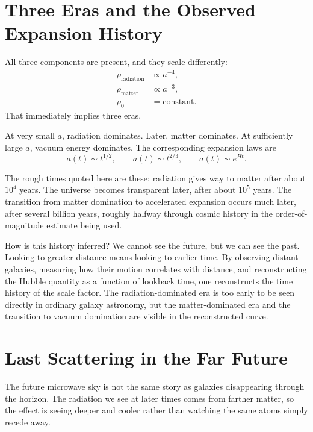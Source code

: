 \section{Three Eras and the Observed Expansion History}

All three components are present, and they scale differently:
\begin{equation}
\begin{aligned}
\rho_{\text{radiation}}&\propto a^{-4},\\
\rho_{\text{matter}}&\propto a^{-3},\\
\rho_0&=\text{constant}.
\end{aligned}
\end{equation}
That immediately implies three eras.

At very small \(a\), radiation dominates. Later, matter dominates. At sufficiently large \(a\), vacuum energy dominates. The corresponding expansion laws are
\begin{equation}
a(t)\sim t^{1/2},
\qquad
a(t)\sim t^{2/3},
\qquad
a(t)\sim e^{Ht}.
\end{equation}

The rough times quoted here are these: radiation gives way to matter after about \(10^4\) years. The universe becomes transparent later, after about \(10^5\) years. The transition from matter domination to accelerated expansion occurs much later, after several billion years, roughly halfway through cosmic history in the order-of-magnitude estimate being used.

How is this history inferred? We cannot see the future, but we can see the past. Looking to greater distance means looking to earlier time. By observing distant galaxies, measuring how their motion correlates with distance, and reconstructing the Hubble quantity as a function of lookback time, one reconstructs the time history of the scale factor. The radiation-dominated era is too early to be seen directly in ordinary galaxy astronomy, but the matter-dominated era and the transition to vacuum domination are visible in the reconstructed curve.

\section{Last Scattering in the Far Future}

The future microwave sky is not the same story as galaxies disappearing through the horizon. The radiation we see at later times comes from farther matter, so the effect is seeing deeper and cooler rather than watching the same atoms simply recede away.

